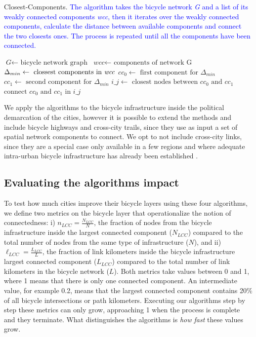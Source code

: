 \begin{algorithm}[h!]
  \caption{Closest-Components. \textcolor{blue}{The algorithm takes the bicycle network \textit{G} and a list of its weakly connected components \textit{wcc}, then it iterates over the weakly connected components, calculate the distance between available components and connect the two closests ones. The process is repeated until all the components have been connected.}}\label{al:CC}
  \begin{algorithmic}[1]
    \State $\textit{G} \gets \text{ bicycle network graph}$
    \State $\textit{wcc} \gets \text{ components of network G}$
    \State $\Delta_{min} \gets \text{ clossest components in \textit{wcc}}$
    \State $cc_{0} \gets \text{ first component for }\Delta_{min}$
    \State $cc_{1} \gets \text{ second component for } \Delta_{min}$
    \State $\textit{i\_j} \gets \text{ closest nodes between } cc_{0} \text{ and } cc_{1}$
    \State $\text{connect } cc_{0} \text{ and } cc_{1} \text{ in } i\_j$
    \EndFor
    \EndProcedure
  \end{algorithmic}
\end{algorithm}

We apply the algorithms to the bicycle infrastructure inside the political demarcation of the cities, however it is possible to extend the methods and include bicycle highways and cross-city trails, since they use as input a set of spatial network components to connect. We opt to not include cross-city links, since they are a special case only available in a few regions and where adequate intra-urban bicycle infrastructure has already been established \cite{Hildebrandt2013BicycleHighways,Taciuk2018Bicycle}.

\subsection{Evaluating the algorithms impact}

To test how much cities improve their bicycle layers using these four algorithms, we define two metrics on the bicycle layer that operationalize the notion of connectedness: i) $n_{LCC} = \frac{N_{LCC}}{N} $, the fraction of nodes from the bicycle infrastructure inside the largest connected component ($N_{LCC}$) compared to the total number of nodes from the same type of infrastructure ($N$), and ii) $\ell_{LCC} = \frac{L_{LCC}}{L} $, the fraction of link kilometers inside the bicycle infrastructure largest connected component ($L_{LCC}$) compared to the total number of link kilometers in the bicycle network ($L$). Both metrics take values between 0 and 1, where 1 means that there is only one connected component. An intermediate value, for example 0.2, means that the largest connected component contains 20\% of all bicycle intersections or path kilometers. Executing our algorithms step by step these metrics can only grow, approaching 1 when the process is complete and they terminate. What distinguishes the algorithms is \emph{how fast} these values grow.


